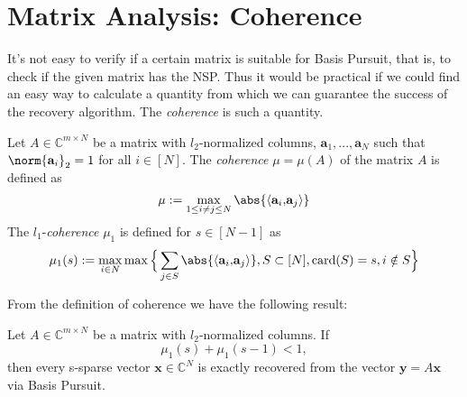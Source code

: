 \section{Matrix Analysis: Coherence}

It's not easy to verify if a certain matrix is suitable for Basis Pursuit, that is, to check if the given matrix has the NSP. Thus it would be practical if we could find an easy way to calculate a quantity from which we can guarantee the success of the recovery algorithm. The \emph{coherence} is such a quantity. 

\begin{tcolorbox}[colback=blue,colframe=white]
\begin{definition}
Let $A \in \mathbb{C}^{m \times N}$ be a matrix with $l_2$-normalized columns, $\mathbf{a}_1,...,\mathbf{a}_N$ such that $\norm{\mathbf{a}_i}_2 = 1$ for all $i \in [N]$. The \emph{coherence} $\mu = \mu(A)$ of the matrix $A$ is defined as 
\begin{equation*}
\mu:= \max_{1 \leq i \neq j \leq N} \abs{\langle\mathbf{a}_i{,}\mathbf{a}_j\rangle}
\end{equation*}
The $l_1$-\emph{coherence} $\mu_1$ is defined for $s \in [N-1]$ as
\begin{equation*}
\mu_1(s):= \max_{i \in N} \max \Big\{\sum_{j \in S}\abs{\langle\mathbf{a}_i{,}\mathbf{a}_j\rangle}, S \subset [N], \text{card}(S) = s, i \notin S \Big\} 
\end{equation*}
\end{definition}
\end{tcolorbox}



From the definition of coherence we have the following result:


\begin{tcolorbox}[colback=yellow,colframe=white]
\begin{theorem}
Let $A \in \mathbb{C}^{m \times N}$ be a matrix with $l_2$-normalized columns. If
\begin{equation*}
\mu_1(s) + \mu_1(s-1) < 1 ,
\end{equation*}
then every s-sparse vector $\mathbf{x} \in \mathbb{C}^N$ is exactly recovered from the vector $\mathbf{y} = A\mathbf{x}$ via Basis Pursuit.
\end{theorem}
\end{tcolorbox}

